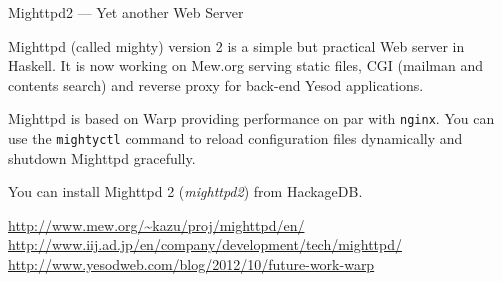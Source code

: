 \begin{hcarentry}[updated]{Mighttpd2 --- Yet another Web Server}
\label{mighttpd2}
\makeheader

Mighttpd (called mighty) version 2 is a simple but practical Web server in Haskell.
It is now working on Mew.org serving static files, CGI (mailman and contents search) and reverse proxy for back-end Yesod applications.

Mighttpd is based on Warp providing
performance on par with {\tt nginx}.
You can use the {\tt mightyctl} command to
reload configuration files dynamically and shutdown Mighttpd gracefully.

You can install Mighttpd 2 ({\it mighttpd2}) from HackageDB.

\FurtherReading
  \url{http://www.mew.org/~kazu/proj/mighttpd/en/}
  \url{http://www.iij.ad.jp/en/company/development/tech/mighttpd/}
  \url{http://www.yesodweb.com/blog/2012/10/future-work-warp}
\end{hcarentry}
